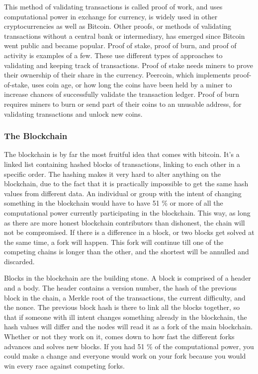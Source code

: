 \documentclass[11pt]{article}
\begin{document}
This method of validating transactions is called proof of work, and uses computational power in exchange for currency, is widely used in other cryptocurrencies as well as Bitcoin. Other proofs, or methods of validating transactions without a central bank or intermediary, has emerged since Bitcoin went public and became popular. Proof of stake, proof of burn, and proof of activity is examples of a few. These use different  types of approaches to validating and keeping track of transactions. Proof of stake needs miners to prove their ownership of their share in the currency. Peercoin, which implements proof-of-stake, uses coin age, or how long the coins have been held by a miner to increase chances of successfully validate the transaction ledger. Proof of burn requires miners to burn or send part of their coins to an unusable address, for validating transactions and unlock new coins. 

\subsubsection{The Blockchain}

The blockchain is by far the most fruitful idea that comes with bitcoin. It's a linked list containing hashed blocks of transactions, linking to each other in a specific order. The hashing makes it very hard to alter anything on the blockchain, due to the fact that it is practically impossible to get the same hash values from different data. An individual or group with the intent of changing something in the blockchain would have to have 51 \% or more of all the computational power currently participating in the blockchain. This way, as long as there are more honest blockchain contributors than dishonest, the chain will not be compromised. If there is a difference in a block, or two blocks get solved at the same time, a fork will happen. This fork will continue till one of the competing chains is longer than the other, and the shortest will be annulled and discarded. 

Blocks in the blockchain are the building stone. A block is comprised of a header and a body. The header contains a version number, the hash of the previous block in the chain, a Merkle root of the transactions, the current difficulty, and the nonce. The previous block hash is there to link all the blocks together, so that if someone with ill intent changes something already in the blockchain, the hash values will differ and the nodes will read it as a fork of the main blockchain. Whether or not they work on it, comes down to how fast the different forks advances and solves new blocks. If you had 51 \% of the computational power, you could make a change and everyone would work on your fork because you would win every race against competing forks.
\end{document}
